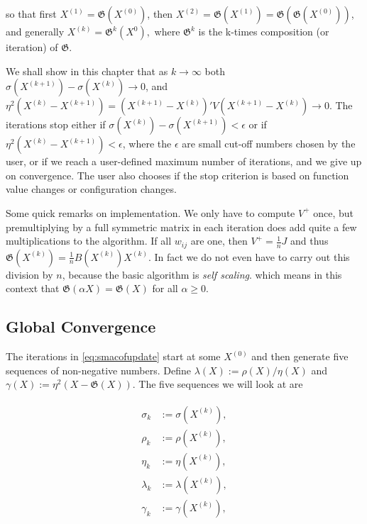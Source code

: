 \documentclass[
  12pt,
]{book}
\theoremstyle{definition}
\theoremstyle{definition}
\theoremstyle{definition}
\theoremstyle{definition}
\theoremstyle{remark}
\begin{document}
so that first \(X^{(1)}=\mathfrak{G}(X^{(0)})\), then
\(X^{(2)}=\mathfrak{G}(X^{(1)})=\mathfrak{G}(\mathfrak{G}(X^{(0)}))\),
and generally \(X^{(k)}=\mathfrak{G}^k(X^{0}),\)
where \(\mathfrak{G}^k\) is the k-times composition (or iteration) of \(\mathfrak{G}.\)

We shall show in this chapter that as \(k\rightarrow\infty\) both\\
\(\sigma(X^{(k+1)})-\sigma(X^{(k)})\rightarrow 0\), and
\(\eta^2(X^{(k)}-X^{(k+1)})=(X^{(k+1)}-X^{(k)})'V(X^{(k+1)}-X^{(k)})\rightarrow 0\).
The iterations stop either if \(\sigma(X^{(k)})-\sigma(X^{(k+1)})<\epsilon\) or if
\(\eta^2(X^{(k)}-X^{(k+1)})<\epsilon\), where the \(\epsilon\) are small cut-off numbers chosen by the user, or if we reach a user-defined maximum number of iterations, and we give up on convergence. The user also chooses if the stop criterion is based on function value changes or configuration changes.

Some quick remarks on implementation. We only have to compute \(V^+\) once, but
premultiplying by a full symmetric matrix in each iteration does add quite a few
multiplications to the algorithm. If all \(w_{ij}\) are one, then \(V^+=\frac{1}{n}J\)
and thus \(\mathfrak{G}(X^{(k)})=\frac{1}{n}B(X^{(k)})X^{(k)}\). In fact we do not
even have to carry out this division by \(n\), because the basic algorithm is \emph{self scaling}. which means in this context that \(\mathfrak{G}(\alpha X)=\mathfrak{G}(X)\) for all
\(\alpha\geq 0\).

\hypertarget{global-convergence}{%
\subsection{Global Convergence}\label{global-convergence}}

The iterations in \eqref{eq:smacofupdate} start at some \(X^{(0)}\) and then generate five sequences of non-negative numbers. Define \(\lambda(X):=\rho(X)/\eta(X)\)
and \(\gamma(X):=\eta^2(X-\mathfrak{G}(X))\). The five sequences we will look at are

\begin{align}
\begin{split}
\sigma_k&:=\sigma(X^{(k)}),\\
\rho_k&:=\rho(X^{(k)}),\\
\eta_k&:=\eta(X^{(k)}),\\
\lambda_k&:=\lambda(X^{(k)}),\\
\gamma_k&:=\gamma(X^{(k)}),
\end{split}
\label{eq:smacofseq}
\end{align}
\end{document}
